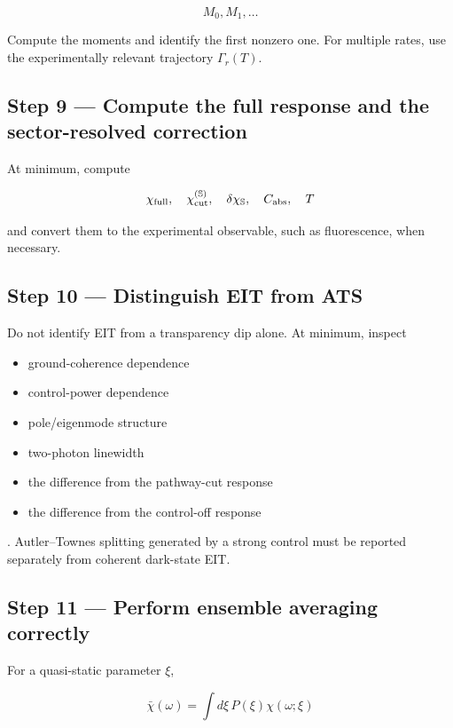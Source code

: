 \documentclass[
  10pt,
  a4paper,
]{article}
\providecommand{\tightlist}{%
  \setlength{\itemsep}{0pt}\setlength{\parskip}{0pt}}
\begin{document}
\[
M_0,M_1,\ldots
\]

Compute the moments and identify the first nonzero one. For multiple
rates, use the experimentally relevant trajectory \(\Gamma_r(T)\).

\subsection{Step 9 --- Compute the full response and the sector-resolved
correction}\label{step-9-compute-the-full-response-and-the-sector-resolved-correction}

At minimum, compute

\[
\chi_{\rm full},
\quad
\chi_{\rm cut}^{(\mathbb S)},
\quad
\delta\chi_{\mathbb S},
\quad
C_{\rm abs},
\quad
T
\]

and convert them to the experimental observable, such as fluorescence,
when necessary.

\subsection{Step 10 --- Distinguish EIT from
ATS}\label{step-10-distinguish-eit-from-ats}

Do not identify EIT from a transparency dip alone. At minimum, inspect

\begin{itemize}
\tightlist
\item
  ground-coherence dependence
\item
  control-power dependence
\item
  pole/eigenmode structure
\item
  two-photon linewidth
\item
  the difference from the pathway-cut response
\item
  the difference from the control-off response
\end{itemize}

. Autler--Townes splitting generated by a strong control must be
reported separately from coherent dark-state EIT.

\subsection{Step 11 --- Perform ensemble averaging
correctly}\label{step-11-perform-ensemble-averaging-correctly}

For a quasi-static parameter \(\xi\),

\[
\bar\chi(\omega)
=\int d\xi\,P(\xi)\chi(\omega;\xi)
\]
\end{document}
